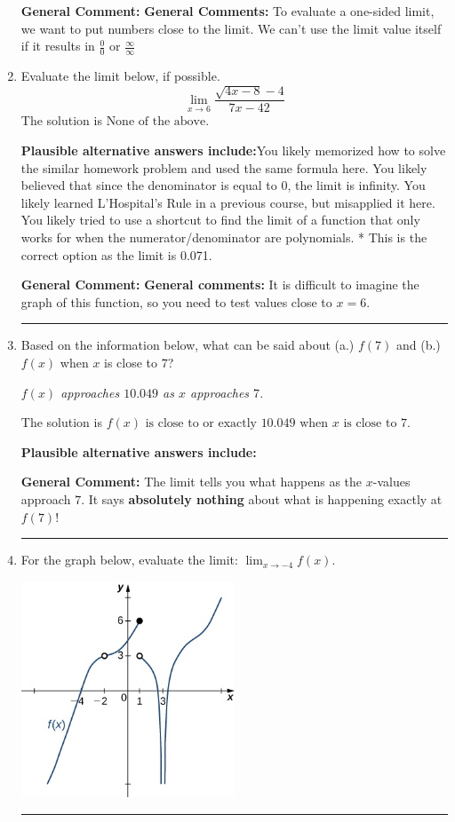\documentclass{extbook}[14pt]
\newcommand{\litem}[1]{\item #1

\rule{\textwidth}{0.4pt}}
\begin{document}
\begin{enumerate}
{\textbf{General Comment:} \textbf{General Comments:} To evaluate a one-sided limit, we want to put numbers close to the limit. We can't use the limit value itself if it results in $\frac{0}{0}$ or $\frac{\infty}{\infty}$
}
\litem{
Evaluate the limit below, if possible.
\[ \lim_{x \rightarrow 6} \frac{\sqrt{4x - 8} - 4}{7x - 42} \]The solution is \( \text{None of the above} \).\begin{enumerate}[label=\Alph*.]
\textbf{Plausible alternative answers include:}You likely memorized how to solve the similar homework problem and used the same formula here.
You likely believed that since the denominator is equal to 0, the limit is infinity.
You likely learned L'Hospital's Rule in a previous course, but misapplied it here.
You likely tried to use a shortcut to find the limit of a function that only works for when the numerator/denominator are polynomials.
* This is the correct option as the limit is 0.071.
\end{enumerate}

\textbf{General Comment:} \textbf{General comments:} It is difficult to imagine the graph of this function, so you need to test values close to $x = 6$.
}
\litem{
Based on the information below, what can be said about (a.) $f(7)$ and (b.) $f(x)$ when $x$ is close to $7$?

\begin{center}
    \textit{ $f(x)$ approaches $10.049$ as $x$ approaches $7$. }
\end{center}
The solution is \( f(x) \text{ is close to or exactly } 10.049 \text{ when } x \text{ is close to } 7 \).\begin{enumerate}[label=\Alph*.]
\textbf{Plausible alternative answers include:}




\end{enumerate}

\textbf{General Comment:} The limit tells you what happens as the $x$-values approach $7$. It says \textbf{absolutely nothing} about what is happening exactly at $f(7)$!
}
\litem{
For the graph below, evaluate the limit: $ \displaystyle \lim_{x \rightarrow -4} f(x)$.

\begin{center}
    \includegraphics[width=0.5\textwidth]{../Figures/evaluateLimitGraphicallyB.png}
\end{center}


}
\end{enumerate}
\end{document}
